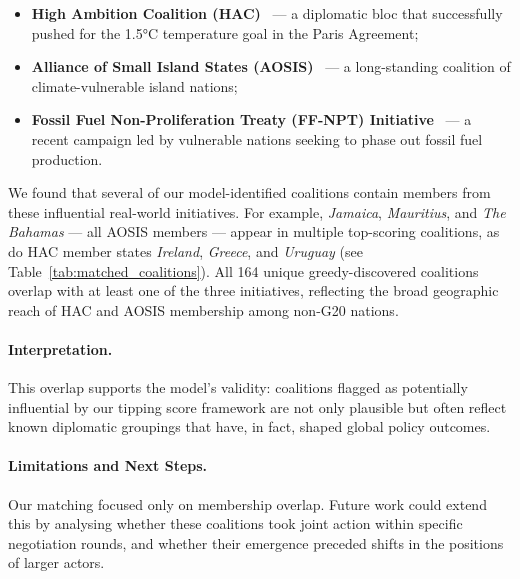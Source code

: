 \documentclass[11pt]{article}
\begin{document}
\begin{itemize}
	\item \textbf{High Ambition Coalition (HAC)}~\cite{yamin2021hac} — a diplomatic bloc that successfully pushed for the 1.5°C temperature goal in the Paris Agreement;
	\item \textbf{Alliance of Small Island States (AOSIS)}~\cite{aosis2023, betzold2012aosis} — a long-standing coalition of climate-vulnerable island nations;
	\item \textbf{Fossil Fuel Non-Proliferation Treaty (FF-NPT) Initiative}~\cite{ffnpt2024} — a recent campaign led by vulnerable nations seeking to phase out fossil fuel production.
\end{itemize}

We found that several of our model-identified coalitions contain members from these influential real-world initiatives. For example, \textit{Jamaica}, \textit{Mauritius}, and \textit{The Bahamas} — all AOSIS members — appear in multiple top-scoring coalitions, as do HAC member states \textit{Ireland}, \textit{Greece}, and \textit{Uruguay} (see Table~\ref{tab:matched_coalitions}). All 164 unique greedy-discovered coalitions overlap with at least one of the three initiatives, reflecting the broad geographic reach of HAC and AOSIS membership among non-G20 nations.

\paragraph{Interpretation.}
This overlap supports the model's validity: coalitions flagged as potentially influential by our tipping score framework are not only plausible but often reflect known diplomatic groupings that have, in fact, shaped global policy outcomes.

\paragraph{Limitations and Next Steps.}
Our matching focused only on membership overlap. Future work could extend this by analysing whether these coalitions took joint action within specific negotiation rounds, and whether their emergence preceded shifts in the positions of larger actors.

\begin{table}[htbp]
	\centering
	\scriptsize
	
	\caption{Sample of high-scoring minor-player coalitions with overlaps to known real-world initiatives. Full results available at:
		\href{https://github.com/its-not-rocket-science/tensor-based-game-theory-identifying-critical-coalitions-climate-change-negotiations/blob/main/python/outputs/matched_real_world_coalitions.csv}{\texttt{matched\_real\_world\_coalitions.csv (GitHub)}}}
	\label{tab:matched_coalitions}
\end{table}
\end{document}

